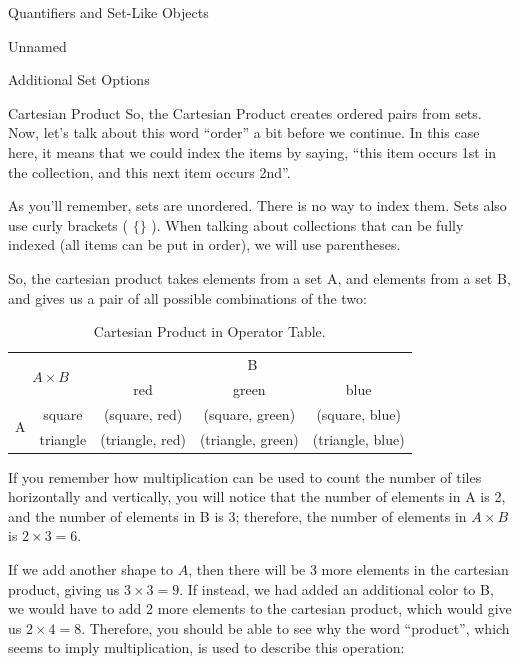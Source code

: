 \begin{part}{Quantifiers and Set-Like Objects}
\begin{chapter}{Unnamed}
\begin{section}{Additional Set Options}
\begin{subsection}{Cartesian Product}
                So, the Cartesian Product creates ordered pairs from sets. Now, let's talk about this word ``order'' a bit before we continue. In this case here, it means that we could index the items by saying, ``this item occurs 1st in the collection, and this next item occurs 2nd''.
                
                As you'll remember, sets are unordered. There is no way to index them. Sets also use curly brackets ( $\{ \}$ ). When talking about collections that can be fully indexed (all items can be put in order), we will use parentheses.
                
                So, the cartesian product takes elements from a set A, and elements from a set B, and gives us a pair of all possible combinations of the two:
                
                \begin{table}[ht]
                    \centering
                    \begin{tabular}{|c|c|c|c|c|}
                        \hline
                        \multicolumn{2}{|c|}{\multirow{2}{*}{$A \times B$}} & \multicolumn{3}{c|}{B} \\ \cline{3-5} 
                        \multicolumn{2}{|c|}{} & red & green & blue \\ \hline
                        \multirow{2}{*}{A} & square & (square, red) & (square, green) & (square, blue) \\ \cline{2-5} 
                         & triangle & (triangle, red) & (triangle, green) & (triangle, blue) \\ \hline
                        \end{tabular}
                    \caption{Cartesian Product in Operator Table.}
                    \label{CartesianProductOperatorTable}
                \end{table}
                
                If you remember how multiplication can be used to count the number of tiles horizontally and vertically, you will notice that the number of elements in A is 2, and the number of elements in B is 3; therefore, the number of elements in $A\times B$ is $2 \times 3 = 6$.
                
                If we add another shape to $A$, then there will be 3 more elements in the cartesian product, giving us $3 \times 3 = 9$. If instead, we had added an additional color to B, we would have to add 2 more elements to the cartesian product, which would give us $2 \times 4 = 8$. Therefore, you should be able to see why the word ``product'', which seems to imply multiplication, is used to describe this operation:
                

\end{subsection}
\end{section}
\end{chapter}
\end{part}
